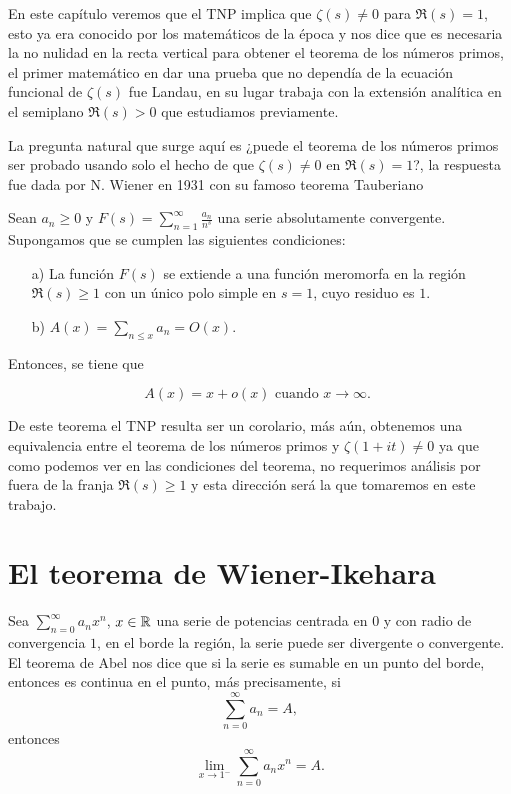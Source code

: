 En este capítulo veremos que el TNP implica que $\zeta(s)\neq 0$ para $\Re(s)=1$, esto ya era conocido por los matemáticos de la época y nos dice que es necesaria la no nulidad en la recta vertical para obtener el teorema de los números primos, el primer matemático en dar una prueba que no dependía de la ecuación funcional de $\zeta(s)$ fue Landau, en su lugar trabaja con la extensión analítica en el semiplano $\Re(s)>0$ que estudiamos previamente.

La pregunta natural que surge aquí es ¿puede el teorema de los números primos ser probado usando solo el hecho de que $\zeta(s)\neq 0$ en $\Re(s)=1$?, la respuesta fue dada por N. Wiener en 1931 con su famoso teorema Tauberiano


\begin{theorem}
Sean $a_n \geq 0$ y $F(s)=\displaystyle\sum_{n=1}^{\infty} \frac{a_n}{n^s}$ una serie absolutamente convergente. Supongamos que se cumplen las siguientes condiciones:

\begin{itemize}
\item[a)] La función $F(s)$ se extiende a una función meromorfa en la región $\Re(s) \geq 1$ con un único polo simple en $s=1$, cuyo residuo es $1$.
\item[b)] $A(x)=\displaystyle \sum_{n \leq x} a_n=O(x)$.
\end{itemize}


Entonces, se tiene que

$$
A(x)=x+o(x) \text { cuando } x \rightarrow \infty \text {. }
$$
\end{theorem}

De este teorema el TNP resulta ser un corolario, más aún, obtenemos una equivalencia entre el teorema de los números primos y $\zeta(1+it)\neq 0$ ya que como podemos ver en las condiciones del teorema, no requerimos análisis por fuera de la franja $\Re(s)\geq 1$ y esta dirección será la que tomaremos en este trabajo.

\section{El teorema de Wiener-Ikehara}

Sea $\displaystyle \sum_{n=0}^{\infty} a_n x^n$, $x\in \mathbb{R}$ una serie de potencias centrada en $0$ y con radio  de convergencia $1$, en el borde la región, la serie puede ser divergente o convergente. El teorema de Abel nos dice que si la serie es sumable en un punto del borde, entonces es continua en el punto, más precisamente, si
$$\sum_{n=0}^{\infty} a_n=A,$$
entonces
$$\lim_{x \to 1^-}\sum_{n=0}^{\infty} a_n x^n=A.$$

